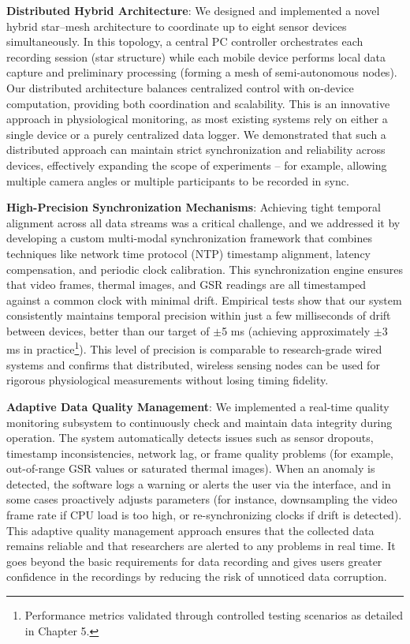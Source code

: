 \textbf{Distributed Hybrid Architecture}: We designed and implemented a novel hybrid star--mesh architecture to coordinate up to eight sensor devices simultaneously. In this topology, a central PC controller orchestrates each recording session (star structure) while each mobile device performs local data capture and preliminary processing (forming a mesh of semi-autonomous nodes). Our distributed architecture balances centralized control with on-device computation, providing both coordination and scalability. This is an innovative approach in physiological monitoring, as most existing systems rely on either a single device or a purely centralized data logger. We demonstrated that such a distributed approach can maintain strict synchronization and reliability across devices, effectively expanding the scope of experiments -- for example, allowing multiple camera angles or multiple participants to be recorded in sync.

\textbf{High-Precision Synchronization Mechanisms}: Achieving tight temporal alignment across all data streams was a critical challenge, and we addressed it by developing a custom multi-modal synchronization framework that combines techniques like network time protocol (NTP) timestamp alignment, latency compensation, and periodic clock calibration. This synchronization engine ensures that video frames, thermal images, and GSR readings are all timestamped against a common clock with minimal drift. Empirical tests show that our system consistently maintains temporal precision within just a few milliseconds of drift between devices, better than our target of $\pm$5 ms (achieving approximately $\pm$3 ms in practice\footnote{Performance metrics validated through controlled testing scenarios as detailed in Chapter 5.}). This level of precision is comparable to research-grade wired systems and confirms that distributed, wireless sensing nodes can be used for rigorous physiological measurements without losing timing fidelity.

\textbf{Adaptive Data Quality Management}: We implemented a real-time quality monitoring subsystem to continuously check and maintain data integrity during operation. The system automatically detects issues such as sensor dropouts, timestamp inconsistencies, network lag, or frame quality problems (for example, out-of-range GSR values or saturated thermal images). When an anomaly is detected, the software logs a warning or alerts the user via the interface, and in some cases proactively adjusts parameters (for instance, downsampling the video frame rate if CPU load is too high, or re-synchronizing clocks if drift is detected). This adaptive quality management approach ensures that the collected data remains reliable and that researchers are alerted to any problems in real time. It goes beyond the basic requirements for data recording and gives users greater confidence in the recordings by reducing the risk of unnoticed data corruption.

